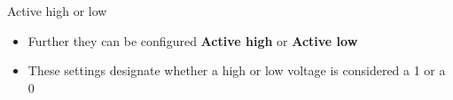 \begin{frame}
   {Active high or low}
   \begin{itemize}
      \item Further they can be configured \textbf{Active high} or \textbf{Active low}
      \item These settings designate whether a high or low voltage is considered a 1 or a 0
   \end{itemize}
\end{frame}

\cprotect\note{


}

